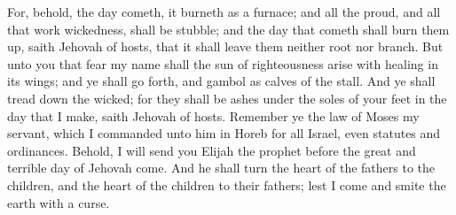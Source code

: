 For, behold, the day cometh, it burneth as a furnace; and all the proud, and all that work wickedness, shall be stubble; and the day that cometh shall burn them up, saith Jehovah of hosts, that it shall leave them neither root nor branch. But unto you that fear my name shall the sun of righteousness arise with healing in its wings; and ye shall go forth, and gambol as calves of the stall. And ye shall tread down the wicked; for they shall be ashes under the soles of your feet in the day that I make, saith Jehovah of hosts.  Remember ye the law of Moses my servant, which I commanded unto him in Horeb for all Israel, even statutes and ordinances. Behold, I will send you Elijah the prophet before the great and terrible day of Jehovah come. And he shall turn the heart of the fathers to the children, and the heart of the children to their fathers; lest I come and smite the earth with a curse. 